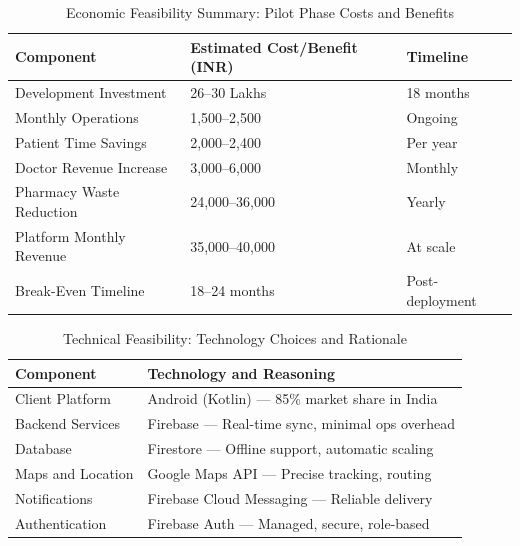 \documentclass[12pt,a4paper]{report}
\begin{document}
\begin{itemize}
\begin{table}[H]
\centering
\fontsize{12}{14.4}\selectfont
\caption{Economic Feasibility Summary: Pilot Phase Costs and Benefits}
\label{tab:cost_benefit}
\begin{tabular}{|p{4cm}|p{3cm}|p{2cm}|}
\hline
\textbf{Component} & \textbf{Estimated Cost/Benefit (INR)} & \textbf{Timeline} \\
\hline
Development Investment & 26--30 Lakhs & 18 months \\
\hline
Monthly Operations & 1,500--2,500 & Ongoing \\
\hline
Patient Time Savings & 2,000--2,400 & Per year \\
\hline
Doctor Revenue Increase & 3,000--6,000 & Monthly \\
\hline
Pharmacy Waste Reduction & 24,000--36,000 & Yearly \\
\hline
Platform Monthly Revenue & 35,000--40,000 & At scale \\
\hline
Break-Even Timeline & 18--24 months & Post-deployment \\
\hline
\end{tabular}
\end{table}

\vspace{1cm}

\begin{table}[H]
\centering
\fontsize{12}{14.4}\selectfont
\caption{Technical Feasibility: Technology Choices and Rationale}
\label{tab:tech_stack}
\begin{tabular}{|p{3.5cm}|p{4cm}|}
\hline
\textbf{Component} & \textbf{Technology and Reasoning} \\
\hline
Client Platform & Android (Kotlin) — 85\% market share in India \\
\hline
Backend Services & Firebase — Real-time sync, minimal ops overhead \\
\hline
Database & Firestore — Offline support, automatic scaling \\
\hline
Maps and Location & Google Maps API — Precise tracking, routing \\
\hline
Notifications & Firebase Cloud Messaging — Reliable delivery \\
\hline
Authentication & Firebase Auth — Managed, secure, role-based \\
\hline
\end{tabular}
\end{table}


\end{itemize}
\end{document}
